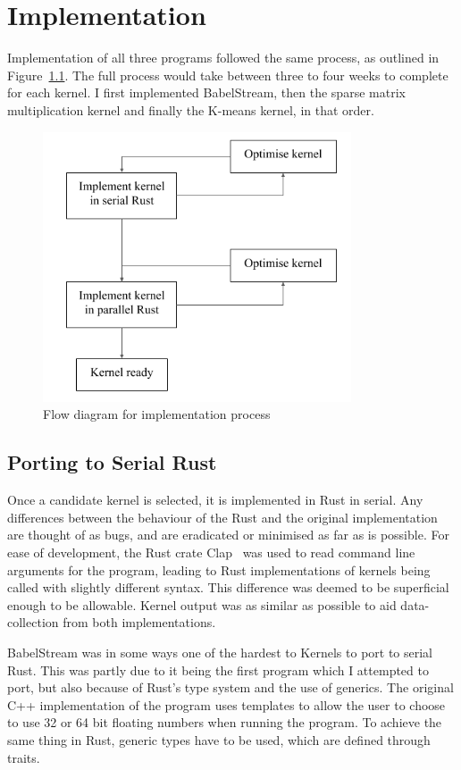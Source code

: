 \chapter{Implementation}
Implementation of all three programs followed the same process, as outlined in Figure~\ref{fig:imp-flow}. The full process would take between three to four weeks to complete for each kernel. I first implemented BabelStream, then the sparse matrix multiplication kernel and finally the K-means kernel, in that order.

\begin{figure}
  \center
  \includegraphics[height=8cm]{figs/ImplementationFlow.png}
  \caption{Flow diagram for implementation process}
  \label{fig:imp-flow}
\end{figure}

\section{Porting to Serial Rust}
Once a candidate kernel is selected, it is implemented in Rust in serial. Any differences between the  behaviour of the Rust and the original implementation are thought of as bugs, and are eradicated or minimised as far as is possible. For ease of development, the Rust crate Clap~\cite{RustClap} was used to read command line arguments for the program, leading to Rust implementations of kernels being called with slightly different syntax. This difference was deemed to be superficial enough to be allowable. Kernel output was as similar as possible to aid data-collection from both implementations.

BabelStream was in some ways one of the hardest to Kernels to port to serial Rust. This was partly due to it being the first program which I attempted to port, but also because of Rust's type system and the use of generics. The original C++ implementation of the program uses templates to allow the user to choose to use 32 or 64 bit floating numbers when running the program. To achieve the same thing in Rust, generic types have to be used, which are defined through traits.

